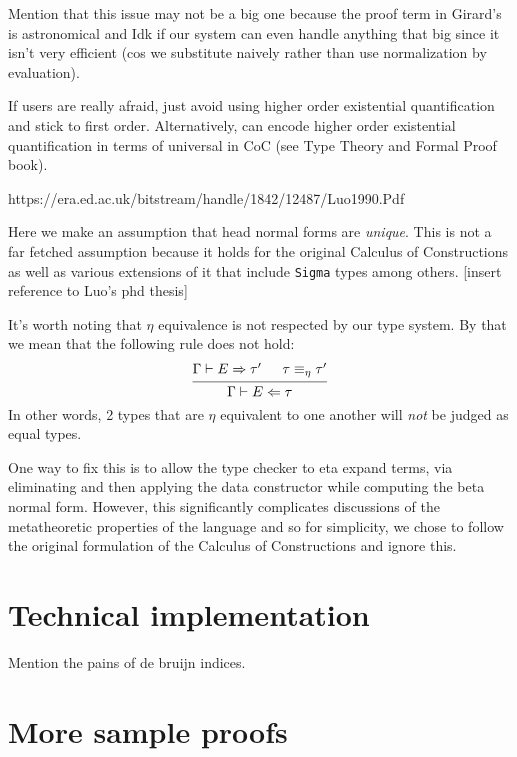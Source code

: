 \documentclass{article}
\begin{document}
Mention that this issue may not be a big one because the proof term in Girard's
is astronomical and Idk if our system can even handle anything that big since it
isn't very efficient (cos we substitute naively rather than use normalization
by evaluation).

If users are really afraid, just avoid using higher order existential
quantification and stick to first order. Alternatively, can encode higher order
existential quantification in terms of universal in CoC (see Type Theory and
Formal Proof book).

https://era.ed.ac.uk/bitstream/handle/1842/12487/Luo1990.Pdf



Here we make an assumption that head normal forms are \textit{unique}. 
This is not a far fetched assumption because it holds for the original Calculus
of Constructions as well as various extensions of it that include \verb|Sigma|
types among others. [insert reference to Luo's phd thesis]



It's worth noting that $\eta$ equivalence is not respected by our type system.
By that we mean that the following rule does not hold:
\[
  \begin{prooftree}
    \hypo{\Gamma \vdash E \Rightarrow \tau'}
    \hypo{\tau \equiv_{\eta} \tau'}
    \infer2{\Gamma \vdash E \Leftarrow \tau}
 \end{prooftree}
\]
In other words, 2 types that are $\eta$ equivalent to one another will 
\textit{not} be judged as equal types.

One way to fix this is to allow the type checker to eta expand terms, via
eliminating and then applying the data constructor while computing the beta
normal form. However, this significantly complicates discussions of the
metatheoretic properties of the language and so for simplicity, we chose to
follow the original formulation of the Calculus of Constructions and ignore
this.


\section{Technical implementation}
Mention the pains of de bruijn indices.

\section{More sample proofs}
\end{document}
